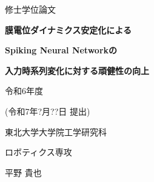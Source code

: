 \begin{titlepage}
    \begin{center}
        {\fontsize{24pt}{24pt}\selectfont  修士学位論文}
        \vspace{3cm}
  
        {\fontsize{20pt}{20pt}\selectfont \textbf{膜電位ダイナミクス安定化による}}
        \vspace{0.5cm}

        {\fontsize{20pt}{20pt}\selectfont \textbf{Spiking Neural Networkの}}
        \vspace{0.5cm}

        {\fontsize{20pt}{20pt}\selectfont \textbf{入力時系列変化に対する頑健性の向上}}
        \vspace{7cm}

        {\fontsize{18pt}{18pt}\selectfont 令和6年度} 
        \vspace{0.5cm}

        {\fontsize{18pt}{18pt}\selectfont (令和7年?月??日 提出)} 
        \vspace{3cm}

        {\fontsize{18pt}{18pt}\selectfont 東北大学大学院工学研究科}
        \vspace{0.5cm}

        {\fontsize{18pt}{18pt}\selectfont ロボティクス専攻}
        \vspace{1.0cm}

        {\fontsize{18pt}{18pt}\selectfont 平野 貴也}
    \end{center}
  \end{titlepage}
\cleardoublepage